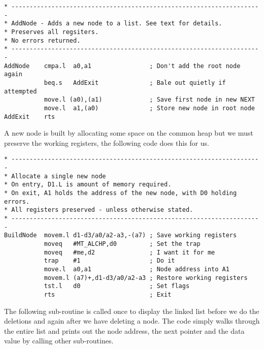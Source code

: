 \begin{lstlisting}[firstnumber=last,caption={Single Linked List - Demo Code - Add Node}]
* ---------------------------------------------------------------------
* AddNode - Adds a new node to a list. See text for details.
* Preserves all regsiters.
* No errors returned.
* ---------------------------------------------------------------------
AddNode    cmpa.l  a0,a1                ; Don't add the root node again
           beq.s   AddExit              ; Bale out quietly if attempted
           move.l (a0),(a1)             ; Save first node in new NEXT
           move.l  a1,(a0)              ; Store new node in root node
AddExit    rts
\end{lstlisting}

A new node is built by allocating some space on the common heap but
    we must preserve the working registers, the following code does this for
    us.

\begin{lstlisting}[firstnumber=last,caption={Single Linked List - Demo Code - Build Node}]
* ---------------------------------------------------------------------
* Allocate a single new node
* On entry, D1.L is amount of memory required.
* On exit, A1 holds the address of the new node, with D0 holding errors.
* All registers preserved - unless otherwise stated.
* ---------------------------------------------------------------------
BuildNode  movem.l d1-d3/a0/a2-a3,-(a7) ; Save working registers
           moveq   #MT_ALCHP,d0         ; Set the trap
           moveq   #me,d2               ; I want it for me
           trap    #1                   ; Do it
           move.l  a0,a1                ; Node address into A1
           movem.l (a7)+,d1-d3/a0/a2-a3 ; Restore working registers
           tst.l   d0                   ; Set flags
           rts                          ; Exit
\end{lstlisting}

The following sub-{}routine is called once to display the linked list
    before we do the deletions and again after we have deleting a node. The
    code simply walks through the entire list and prints out the node address,
    the next pointer and the data value by calling other sub-{}routines.

